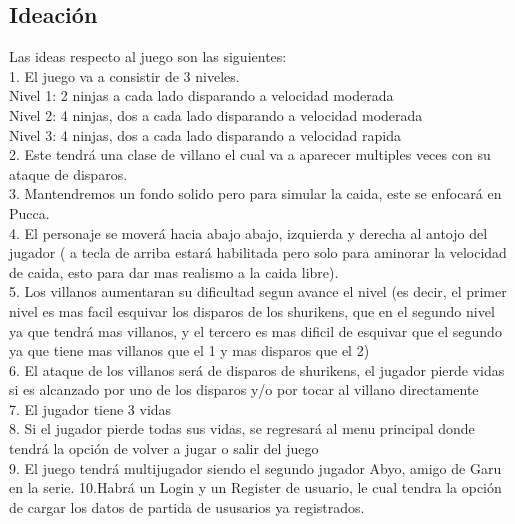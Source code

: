 \documentclass{article}
\begin{document}
\subsection{Ideación}
Las ideas respecto al juego son las siguientes:\\
1. El juego va a consistir de 3 niveles.\\
Nivel 1: 2 ninjas a cada lado disparando a velocidad moderada\\
Nivel 2: 4 ninjas, dos a cada lado disparando a velocidad moderada\\
Nivel 3: 4 ninjas, dos a cada lado disparando a velocidad rapida\\
2. Este tendrá una clase de villano el cual va a aparecer multiples veces con su ataque de disparos.\\
3. Mantendremos un fondo solido pero para simular la caida, este se enfocará en Pucca.\\
4. El personaje se moverá hacia abajo abajo, izquierda y derecha al antojo del jugador ( a tecla de arriba estará habilitada pero solo para aminorar la velocidad de caida, esto para dar mas realismo a la caida libre).\\
5. Los villanos aumentaran su dificultad segun avance el nivel (es decir, el primer nivel es mas facil esquivar los disparos de los shurikens, que en el segundo nivel ya que tendrá mas villanos, y el tercero es mas dificil de esquivar que el segundo ya que tiene mas villanos que el 1 y mas disparos que el 2)\\
6. El ataque de los villanos será de disparos de shurikens, el jugador pierde vidas si es alcanzado por uno de los disparos y/o por tocar al villano directamente\\
7. El jugador tiene 3 vidas\\
8. Si el jugador pierde todas sus vidas, se regresará al menu principal donde tendrá la opción de volver a jugar o salir del juego\\
9. El juego tendrá multijugador siendo el segundo jugador Abyo, amigo de Garu en la serie.
10.Habrá un Login y un Register de usuario, le cual tendra la opción de cargar los datos de partida de ususarios ya registrados.
\end{document}
